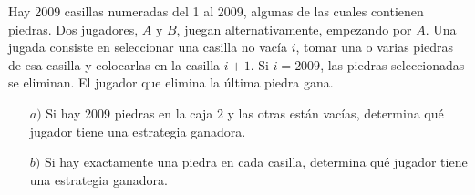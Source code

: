 Hay 2009 casillas numeradas del 1 al 2009, algunas de las cuales contienen piedras. Dos jugadores, $ A$ y $ B$, juegan alternativamente, empezando por $ A$. Una jugada consiste en seleccionar una casilla no vacía $ i$, tomar una o varias piedras de esa casilla y colocarlas en la casilla $ i + 1$. Si $ i = 2009$, las piedras seleccionadas se eliminan. El jugador que elimina la última piedra gana.
\begin{enumerate}
    \item[$a)$] Si hay 2009 piedras en la caja 2 y las otras están vacías, determina qué jugador tiene una estrategia ganadora.
    \item[$b)$] Si hay exactamente una piedra en cada casilla, determina qué jugador tiene una estrategia ganadora.
\end{enumerate}
